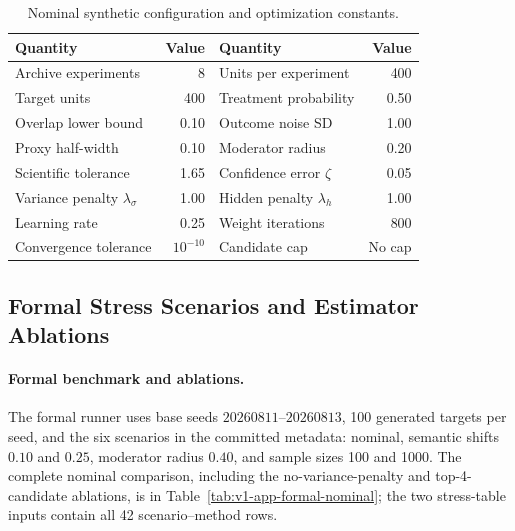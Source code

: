 \documentclass[11pt]{article}
\numberwithin{equation}{section}
\newcommand{\1}{\mathbf 1}
\begin{document}
\begin{table}[H]
\centering
\caption{Nominal synthetic configuration and optimization constants.}
\label{tab:v1-app-config}
\begin{tabular}{lr@{\qquad}lr}
\toprule
Quantity & Value & Quantity & Value \\
\midrule
Archive experiments & 8 & Units per experiment & 400 \\
Target units & 400 & Treatment probability & 0.50 \\
Overlap lower bound & 0.10 & Outcome noise SD & 1.00 \\
Proxy half-width & 0.10 & Moderator radius & 0.20 \\
Scientific tolerance & 1.65 & Confidence error $\zeta$ & 0.05 \\
Variance penalty $\lambda_\sigma$ & 1.00 & Hidden penalty $\lambda_h$ & 1.00 \\
Learning rate & 0.25 & Weight iterations & 800 \\
Convergence tolerance & $10^{-10}$ & Candidate cap & No cap \\
\bottomrule
\end{tabular}
\end{table}


\subsection{Formal Stress Scenarios and Estimator Ablations}
\label{app:formal-ablations}
\suppressfloats[t]

\paragraph{Formal benchmark and ablations.}
The formal runner uses base seeds $20260811$--$20260813$, 100 generated targets per seed, and the six scenarios in the committed metadata: nominal, semantic shifts $0.10$ and $0.25$, moderator radius $0.40$, and sample sizes 100 and 1000.  The complete nominal comparison, including the no-variance-penalty and top-4-candidate ablations, is in Table~\ref{tab:v1-app-formal-nominal}; the two stress-table inputs contain all 42 scenario--method rows.




\end{document}

